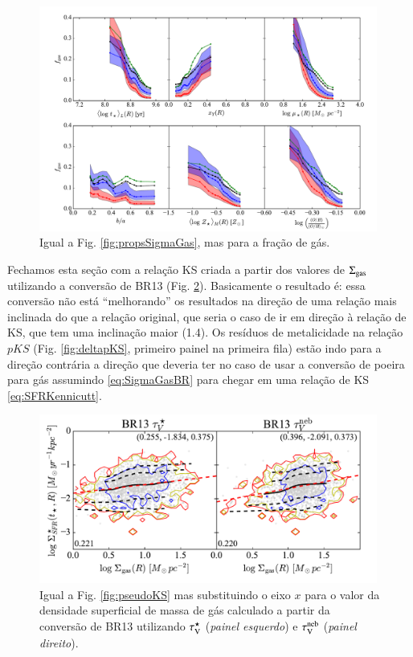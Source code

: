 \begin{figure}
	\centering
 	\includegraphics[width=0.99\textwidth]{figuras/props_fGas.pdf}
 	\caption[Propriedades físicas e $f_{\mathrm{gas}}$]
 	{Igual a Fig. \ref{fig:propsSigmaGas}, mas para a fração de gás.}
 	\label{fig:propsfGas}
\end{figure} 

Fechamos esta seção com a relação KS criada a partir dos valores de $\Sigma_{\mathrm{gas}}$ utilizando a
conversão de BR13 (Fig. \ref{fig:KS}). Basicamente o resultado é: essa conversão não está
``melhorando'' os resultados na direção de uma relação mais inclinada do que a relação original, que
seria o caso de ir em direção à relação de KS, que tem uma inclinação maior (1.4). Os resíduos de
metalicidade na relação $pKS$ (Fig. \ref{fig:deltapKS}, primeiro painel na primeira fila) estão indo
para a direção contrária a direção que deveria ter no caso de usar a conversão de poeira para gás
assumindo \eqref{eq:SigmaGasBR} para chegar em uma relação de KS \eqref{eq:SFRKennicutt}.

\begin{figure}
	\centering
	\includegraphics[width=0.99\textwidth]{figuras/KS.pdf}
	\caption[Relação de Kennicut-Schmidt]
	{Igual a Fig. \ref{fig:pseudoKS} mas substituindo o eixo $x$ para o valor da densidade superficial
de massa de gás calculado a partir da conversão de BR13 utilizando $\tau_{\mathrm{V}}^\star$ ({\em painel esquerdo})
e $\tau_{\mathrm{V}}^{\mathrm{neb}}$ ({\em painel direito}).}
	\label{fig:KS}
\end{figure}

